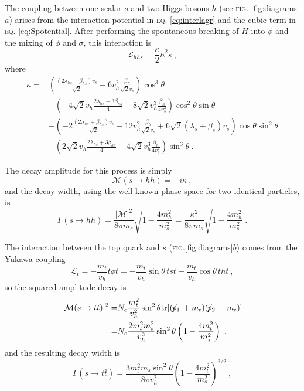 \documentclass[aps,prd,preprintnumbers,nofootinbibn,twocolumn]{revtex4}
\newcommand{\tr}{\mathrm{tr}}
\newcommand{\sla}[1]{\!\not\!#1\,}
\begin{document}
The coupling between one scalar $s$ and two Higgs bosons $h$ (see \textsc{fig.} \ref{fig:diagrams}$a$) arises from the interaction potential in \textsc{eq.} \eqref{eq:interlagr} and the cubic term in \textsc{eq.} \eqref{eq:Spotential}. After performing the spontaneous breaking of $H$ into $\phi$ and the mixing of $\phi$ and $\sigma$, this interaction is
\begin{equation}
\mathcal{L}_{hhs} = \frac{\kappa}{2} h^2 s\ ,
\end{equation}
where
{\scriptsize\begin{align}
\kappa =& \left(\frac{(2\lambda_{hs} + \beta_{hs})v_s}{\sqrt{2}} + 6 v_h^2\frac{\beta_h}{\sqrt{2} v_s} \right)\cos^3 \theta \nonumber\\
&+ \left(-4\sqrt{2}v_h \frac{2\lambda_{hs} + 3\beta_{hs}}{4} - 8\sqrt{2}v_h^3  \frac{\beta_h}{4 v_s^2} \right)\cos^2\theta \sin \theta \nonumber\\
&+ \left(-2\frac{(2\lambda_{hs} + \beta_{hs})v_s}{\sqrt{2}} -12 v_h^2\frac{\beta_h}{\sqrt{2} v_s} +6\sqrt{2}(\lambda_s+\beta_s) v_s \right)\cos\theta \sin^2\theta \nonumber\\
&+\left(2\sqrt{2}v_h \frac{2\lambda_{hs} + 3\beta_{hs}}{4} -4\sqrt{2}v_h^3 \frac{\beta_h}{4 v_s^2} \right)\sin^3\theta\ .
\end{align}}

The decay amplitude for this process is simply
\begin{equation}
\mathcal{M}(s\to hh)= -i \kappa\ ,
\end{equation}
and the decay width, using the well-known phase space for two identical particles, is
\begin{equation}
\Gamma(s\to hh) = \frac{|\mathcal{M}|^2}{8\pi m_s}\sqrt{1-\frac{4m_h^2}{m_s^2}} = \frac{\kappa^2}{8\pi m_s}\sqrt{1-\frac{4m_h^2}{m_s^2}}\ .
\end{equation}

The interaction between the top quark and $s$ (\textsc{fig.}\ref{fig:diagrams}$b$) comes from the Yukawa coupling 
\begin{equation}
\mathcal{L}_t = -\frac{m_t}{v_h}\bar{t}\phi t=  -\frac{m_t}{v_h}\sin\theta\, \bar{t} s t-\frac{m_t}{v_h}\cos\theta\, \bar{t} h t\ ,
\end{equation}
so the squared amplitude decay is 
\begin{align}
|\mathcal{M}(s\to t\bar{t})|^2 =& N_c \frac{m_t^2}{v_h^2}\sin^2\theta \tr[(\sla{p_1} + m_t)(\sla{p_2}-m_t)]\nonumber\\
=& N_c \frac{2 m_t^2 m_s^2 }{v_h^2} \sin^2 \theta \left(1-\frac{4 m_t^2}{m_s^2}\right)\ ,
\end{align}
and the resulting decay width is
\begin{equation}
\Gamma(s \to t \bar{t})= \frac{3 m_t^2 m_s \sin^2\theta}{8\pi  v_h^2} \left(1-\frac{4 m_t^2}{m_s^2}\right)^{3/2} \ ,
\end{equation}
\end{document}
